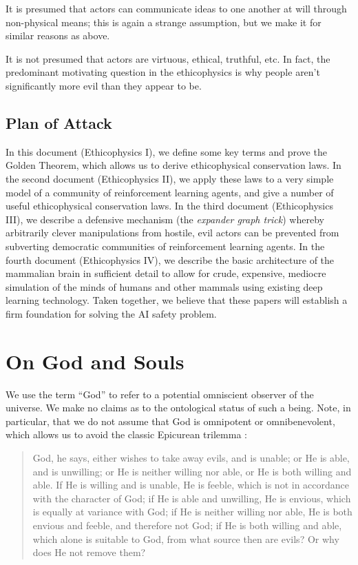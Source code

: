 \documentclass{article}
\begin{document}
It is presumed that actors can communicate ideas to one another at
will through non-physical means; this is again a strange assumption,
but we make it for similar reasons as above.

It is not presumed that actors are virtuous, ethical, truthful,
etc. In fact, the predominant motivating question in the ethicophysics
is why people aren't significantly more evil than they appear to be.

\subsection{Plan of Attack}

In this document (Ethicophysics I), we define some key terms and prove
the Golden Theorem, which allows us to derive ethicophysical
conservation laws. In the second document (Ethicophysics II), we apply
these laws to a very simple model of a community of reinforcement
learning agents, and give a number of useful ethicophysical
conservation laws. In the third document (Ethicophysics III), we
describe a defensive mechanism (the {\em expander graph trick})
whereby arbitrarily clever manipulations from hostile, evil actors can
be prevented from subverting democratic communities of reinforcement
learning agents. In the fourth document (Ethicophysics IV), we
describe the basic architecture of the mammalian brain in sufficient
detail to allow for crude, expensive, mediocre simulation of the minds
of humans and other mammals using existing deep learning
technology. Taken together, we believe that these papers will
establish a firm foundation for solving the AI safety problem.

\section{On God and Souls}

We use the term ``God'' to refer to a potential omniscient observer of
the universe. We make no claims as to the ontological status of such a
being. Note, in particular, that we do not assume that God is
omnipotent or omnibenevolent, which allows us to avoid the classic
Epicurean trilemma \cite{trilemma}:

\begin{quote}
  God, he says, either wishes to take away evils, and is unable; or He
  is able, and is unwilling; or He is neither willing nor able, or He
  is both willing and able. If He is willing and is unable, He is
  feeble, which is not in accordance with the character of God; if He
  is able and unwilling, He is envious, which is equally at variance
  with God; if He is neither willing nor able, He is both envious and
  feeble, and therefore not God; if He is both willing and able, which
  alone is suitable to God, from what source then are evils? Or why
  does He not remove them?
\end{quote}
\end{document}
